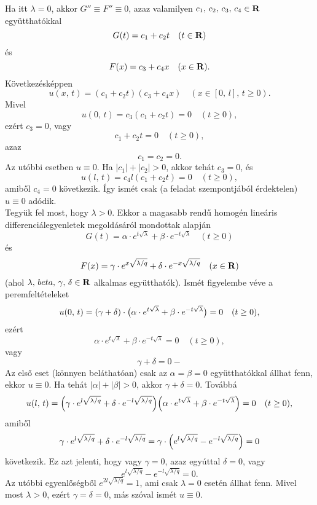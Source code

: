 Ha itt $\lambda = 0$, akkor $G'' \equiv F'' \equiv 0$, azaz valamilyen $c_1, \, c_2, \, c_3, \, c_4 \in \mathbf{R}$ együtthatókkal
\[
	G(t) = c_1 + c_2 t \quad (t \in \mathbf{R})
\]
és
\[
	F(x) = c_3 + c_4 x \quad (x \in \mathbf{R}).
\]
Következésképpen
\[
	u(x, \, t) = (c_1 + c_2t)(c_3 + c_4 x) \quad (x \in [0, \, l], \, t \geq 0).
\]
Mivel
\[
	u(0, \, t) = c_3(c_1 + c_2 t) = 0 \quad (t \geq 0),
\]
ezért $c_3 = 0$, vagy
\[
	c_1 + c_2t = 0 \quad (t \geq 0),
\]
azaz
\[
	c_1 = c_2 = 0.
\]
Az utóbbi esetben $u \equiv 0$. Ha $|c_1| + |c_2| > 0$, akkor tehát $c_3 = 0$, és
\[
	u(l, \, t) = c_4l(c_1 + c_2t)  = 0 \quad (t \geq 0),
\]
amiből $c_4 = 0$ következik. Így ismét csak (a feladat szempontjából érdektelen) $u \equiv 0$ adódik.\\

Tegyük fel most, hogy $\lambda > 0$. Ekkor a magasabb rendű homogén lineáris differenciálegyenletek megoldásáról mondottak alapján
\[
	G(t) = \alpha \cdot e^{t \sqrt{\lambda}} + \beta \cdot e^{-t \sqrt{\lambda}} \quad (t \geq 0)
\]
és
\[
	F(x) = \gamma \cdot e^{x \sqrt{\lambda / q}} + \delta \cdot e^{-x \sqrt{\lambda / q}} \quad (x \in \mathbf{R})
\]
(ahol $\lambda, \, beta, \, \gamma, \, \delta \in \mathbf{R}$ alkalmas együtthatók). Ismét figyelembe véve a peremfeltételeket
\[
	u(0, \, t) = (\gamma + \delta) \cdot \big(  \alpha \cdot e^{t \sqrt{\lambda}} + \beta \cdot e ^{- t \sqrt{\lambda}}  \big) = 0 \quad (t \geq 0),
\]
ezért
\[
	\alpha  \cdot e^{t \sqrt{\lambda}} + \beta \cdot e^{-t \sqrt{\lambda}} = 0 \quad (t \geq 0),
\]
vagy
\[
	\gamma + \delta = 0-
\]
Az első eset (könnyen beláthatóan) csak az $\alpha = \beta = 0$ együtthatókkal állhat fenn, ekkor $u \equiv 0$. Ha tehát $|\alpha| + |\beta| > 0$, akkor $\gamma + \delta = 0$. Továbbá
\[
	u(l, \, t) = \Big(  \gamma \cdot e^{l \sqrt{\lambda / q}} + \delta \cdot e^{-l \sqrt{\lambda / q}} \Big) \Big(  \alpha \cdot e^{t \sqrt{\lambda}} + \beta \cdot e^{-t \sqrt{\lambda}}  \Big) = 0 \quad (t \geq 0),
\]
amiből
\[
	\gamma \cdot e^{l \sqrt{\lambda / q}} + \delta \cdot e^{-l \sqrt{\lambda / q}} = \gamma \cdot \Big(  e^{l \sqrt{\lambda / q}} - e^{-l \sqrt{\lambda / q}} \Big) = 0
\]
következik. Ez azt jelenti, hogy vagy $\gamma = 0$, azaz egyúttal $\delta = 0$, vagy
\[
	e^{l \sqrt{\lambda / q}} - e^{-l \sqrt{\lambda / q}} = 0.
\]
Az utóbbi egyenlőségből $e^{2l \sqrt{\lambda / q}} = 1$, ami csak $\lambda = 0$ esetén állhat fenn. Mivel most $\lambda > 0$, ezért $\gamma = \delta = 0$, más szóval ismét $u \equiv 0$.\\

